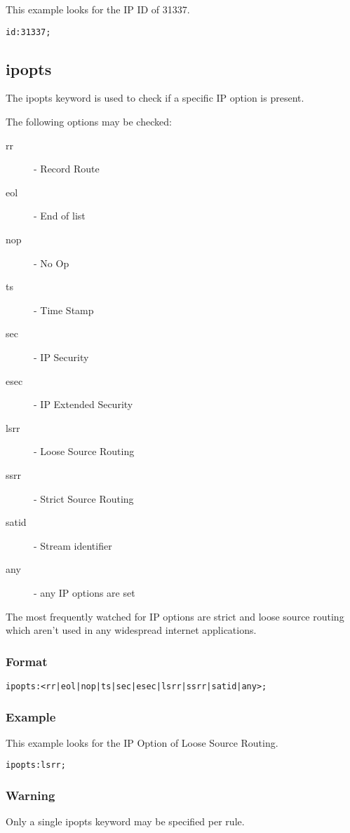 \documentclass[english]{report}
\begin{document}
This example looks for the IP ID of 31337.
\begin{verbatim}
id:31337;
\end{verbatim}

\subsection{ipopts}

The ipopts keyword is used to check if a specific IP option is present.

The following options may be checked:
\begin{description}
\item [rr] - Record Route 
\item [eol] - End of list 
\item [nop] - No Op 
\item [ts] - Time Stamp 
\item [sec] - IP Security
\item [esec] - IP Extended Security
\item [lsrr] - Loose Source Routing 
\item [ssrr] - Strict Source Routing 
\item [satid] - Stream identifier
\item [any] - any IP options are set
\end{description}

The most frequently watched for IP options are strict and loose source
routing which aren't used in any widespread internet applications.


\subsubsection{Format}

\begin{verbatim}
ipopts:<rr|eol|nop|ts|sec|esec|lsrr|ssrr|satid|any>;
\end{verbatim}

\subsubsection{Example}
This example looks for the IP Option of Loose Source Routing.
\begin{verbatim}
ipopts:lsrr;
\end{verbatim}

\subsubsection{Warning}
Only a single ipopts keyword may be specified per rule.
\end{document}
